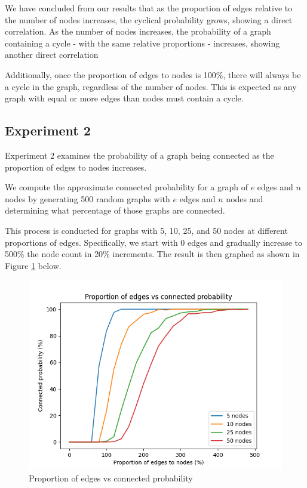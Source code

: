 \documentclass[titlepage]{article}
\begin{document}
We have concluded from our results that as the proportion of edges relative to the number of nodes increases, the cyclical probability grows, showing a direct correlation. As the number of nodes increases, the probability of a graph containing a cycle - with the same relative proportions - increases, showing another direct correlation

Additionally, once the proportion of edges to nodes is 100\%, there will always be a cycle in the graph, regardless of the number of nodes. This is expected as any graph with equal or more edges than nodes must contain a cycle.

\subsection{Experiment 2}

Experiment 2 examines the probability of a graph being connected as the proportion of edges to nodes increases.

We compute the approximate connected probability for a graph of $e$ edges and $n$ nodes by generating 500 random graphs with $e$ edges and $n$ nodes and determining what percentage of those graphs are connected.

This process is conducted for graphs with 5, 10, 25, and 50 nodes at different proportions of edges. Specifically, we start with 0 edges and gradually increase to 500\% the node count in 20\% increments. The result is then graphed as shown in Figure \ref{fig:edges_vs_connected} below.

\begin{figure}[H]
    \centering
    \includegraphics[width=0.8\linewidth]{experiment_2.png}
    \caption{Proportion of edges vs connected probability}
    \label{fig:edges_vs_connected}
\end{figure}
\end{document}
